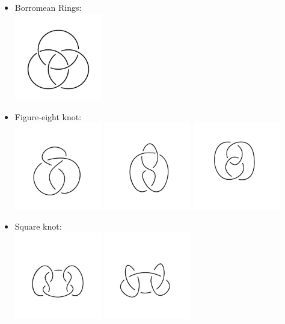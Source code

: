 \documentclass[12 pt]{article}
\begin{document}
\begin{itemize}
\item Borromean Rings:\\
\includegraphics[height = 1.5in]{borromean_rings.jpg}
\item Figure-eight knot:\\
\includegraphics[height = 1.5in]{figure_eight_1.jpg}
\includegraphics[height = 1.5in]{figure_eight_2.jpg}
\includegraphics[height = 1.5in]{figure_eight_3.jpg}
\item Square knot:\\
\includegraphics[height = 1.5in]{square_knot_1.jpg}
\includegraphics[height = 1.5in]{square_knot_2.jpg}
\end{itemize}
\end{document}
